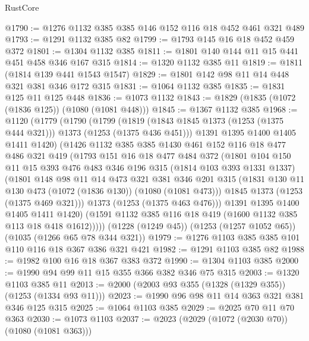 \begin{lexlean}{RustCore}
\begin{coremodule}
@1790 := @1276 @1132 @385 @385 @146 @152 @116 @18 @452 @461 @321 @489
@1793 := @1291 @1132 @385 @82
@1799 := @1793 @145 @16 @18 @452 @459 @372
@1801 := @1304 @1132 @385
@1811 := @1801 @140 @144 @11 @15 @441 @451 @458 @346 @167 @315
@1814 := @1320 @1132 @385 @11
@1819 := @1811 (@1814 @139 @441 @1543 @1547)
@1829 := @1801 @142 @98 @11 @14 @448 @321 @381 @346 @172 @315
@1831 := @1064 @1132 @385
@1835 := @1831 @125 @11 @125 @448
@1836 := @1073 @1132
@1843 := @1829 (@1835 (@1072 (@1836 @125)) (@1080 (@1081 @448)))
@1845 := @1367 @1132 @385
@1968 := @1120
    (@1779
      (@1790
        (@1799
          (@1819 (@1843 @1845 @1373 (@1253 (@1375 @444 @321))) @1373 (@1253 (@1375 @436 @451)))
          @1391
          @1395
          @1400
          @1405
          @1411
          @1420)
        (@1426
          @1132
          @385
          @385
          @1430
          @461
          @152
          @116
          @18
          @477
          @486
          @321
          @419
          (@1793
            @151
            @16
            @18
            @477
            @484
            @372
            (@1801
              @104
              @150
              @11
              @15
              @393
              @476
              @483
              @346
              @196
              @315
              (@1814 @103 @393 @1331 @1337)
              (@1801
                @148
                @98
                @11
                @14
                @473
                @321
                @381
                @346
                @201
                @315
                (@1831 @130 @11 @130 @473 (@1072 (@1836 @130)) (@1080 (@1081 @473)))
                @1845
                @1373
                (@1253 (@1375 @469 @321)))
              @1373
              (@1253 (@1375 @463 @476)))
            @1391
            @1395
            @1400
            @1405
            @1411
            @1420)
          (@1591 @1132 @385 @116 @18 @419 (@1600 @1132 @385 @113 @18 @418 @1612)))))
    (@1228 (@1249 @45))
    (@1253 (@1257 @1052 @65))
    (@1035 (@1266 @65 @78 @344 @321))
@1979 := @1276 @1103 @385 @385 @101 @110 @116 @18 @367 @386 @321 @421
@1982 := @1291 @1103 @385 @82
@1988 := @1982 @100 @16 @18 @367 @383 @372
@1990 := @1304 @1103 @385
@2000 := @1990 @94 @99 @11 @15 @355 @366 @382 @346 @75 @315
@2003 := @1320 @1103 @385 @11
@2013 := @2000 (@2003 @93 @355 (@1328 (@1329 @355)) (@1253 (@1334 @93 @11)))
@2023 := @1990 @96 @98 @11 @14 @363 @321 @381 @346 @125 @315
@2025 := @1064 @1103 @385
@2029 := @2025 @70 @11 @70 @363
@2030 := @1073 @1103
@2037 := @2023 (@2029 (@1072 (@2030 @70)) (@1080 (@1081 @363)))

\end{coremodule}
\end{lexlean}
